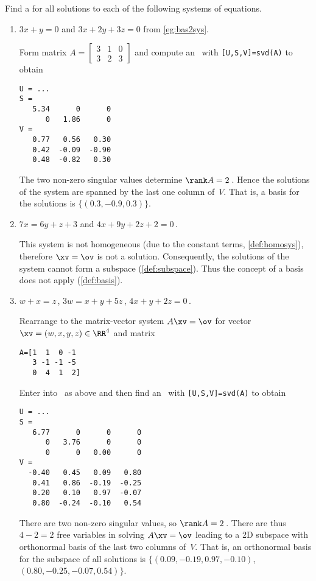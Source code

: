 \begin{example} \label{eg:}
Find a  for all solutions to each of the following systems of equations.
\begin{enumerate}
\item \(3x+y=0\) and \(3x+2y+3z=0\) from \autoref{eg:bas2sys}.
\begin{solution} 
Form matrix \(A=\begin{bmatrix} 3&1&0\\3&2&3 \end{bmatrix}\) and compute an \svd\ with \verb|[U,S,V]=svd(A)| to obtain \twodp
\begin{verbatim}
U = ...
S =
   5.34      0      0
      0   1.86      0
V =
   0.77   0.56   0.30
   0.42  -0.09  -0.90
   0.48  -0.82   0.30
\end{verbatim}
The two non-zero singular values determine \(\rank A=2\)\,.
Hence the solutions of the system are spanned by the last one column of~\(V\).  
That is, a basis for the solutions is \(\{(0.3,-0.9,0.3)\}\).
\end{solution}

\item \(7x=6y+z+3\) and \(4x+9y+2z+2=0\)\,.
\begin{solution} 
This system is not homogeneous (due to the constant terms, \autoref{def:homosys}), therefore \(\xv=\ov\) is not a solution. Consequently, the solutions of the system cannot form a subspace (\autoref{def:subspace}). 
Thus the concept of a basis does not apply (\autoref{def:basis}). 
\end{solution}


\item \(w+x=z\)\,,
\(3w=x+y+5z\)\,,
\(4x+y+2z=0\)\,.
\begin{solution} 
Rearrange to the matrix-vector system \(A\xv=\ov\) for vector \(\xv=(w,x,y,z)\in\RR^4\) and matrix
\begin{verbatim}
A=[1  1  0 -1
   3 -1 -1 -5
   0  4  1  2]
\end{verbatim}
\setbox\ajrqrbox\hbox{}%
\marginpar{\usebox{\ajrqrbox}}%
Enter into \script\ as above and then find an \svd\ with \verb|[U,S,V]=svd(A)| to obtain \twodp
\begin{verbatim}
U = ...
S =
   6.77      0      0      0
      0   3.76      0      0
      0      0   0.00      0
V =
  -0.40   0.45   0.09   0.80
   0.41   0.86  -0.19  -0.25
   0.20   0.10   0.97  -0.07
   0.80  -0.24  -0.10   0.54
\end{verbatim}
There are two non-zero singular values, so \(\rank A=2\)\,.
There are thus \(4-2=2\) free variables in solving \(A\xv=\ov\) leading to a 2D subspace with orthonormal basis of the last two columns of~\(V\).
That is, an orthonormal basis for the subspace of all solutions is \(\{(0.09,-0.19,0.97,-0.10)\), \((0.80,-0.25,-0.07,0.54)\}\). 
\end{solution}

\end{enumerate}
\end{example}
